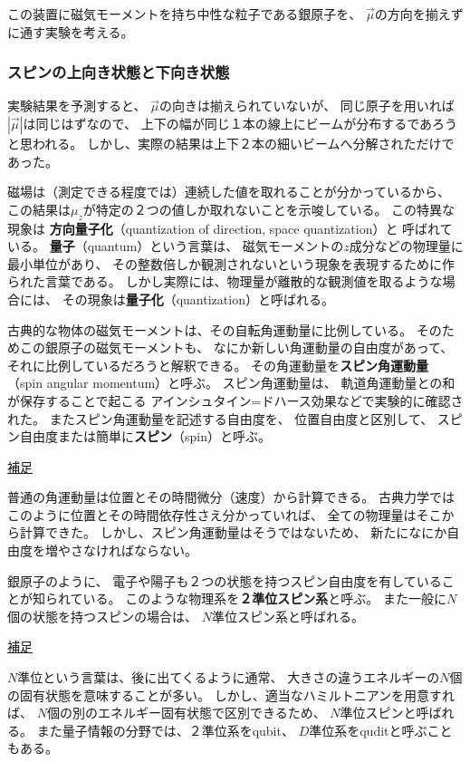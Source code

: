 \documentclass[a4paper, 10pt]{jsarticle}
\begin{document}
この装置に磁気モーメントを持ち中性な粒子である銀原子を、
$\vec{\mu}$の方向を揃えずに通す実験を考える。

\subsubsection{スピンの上向き状態と下向き状態}
実験結果を予測すると、
$\vec{\mu}$の向きは揃えられていないが、
同じ原子を用いれば$|\vec{\mu}|$は同じはずなので、
上下の幅が同じ１本の線上にビームが分布するであろうと思われる。
しかし、実際の結果は上下２本の細いビームへ分解されただけであった。

磁場は（測定できる程度では）連続した値を取れることが分かっているから、
この結果は$\mu_z$が特定の２つの値しか取れないことを示唆している。
この特異な現象は
\textbf{方向量子化}（quantization of direction, space quantization）と
呼ばれている。
\textbf{量子}（quantum）という言葉は、
磁気モーメントの$z$成分などの物理量に最小単位があり、
その整数倍しか観測されないという現象を表現するために作られた言葉である。
しかし実際には、物理量が離散的な観測値を取るような場合には、
その現象は\textbf{量子化}（quantization）と呼ばれる。

古典的な物体の磁気モーメントは、その自転角運動量に比例している。
そのためこの銀原子の磁気モーメントも、
なにか新しい角運動量の自由度があって、
それに比例しているだろうと解釈できる。
その角運動量を\textbf{スピン角運動量}（spin angular momentum）と呼ぶ。
スピン角運動量は、
軌道角運動量との和が保存することで起こる
アインシュタイン=ドハース効果などで実験的に確認された。
またスピン角運動量を記述する自由度を、
位置自由度と区別して、
スピン自由度または簡単に\textbf{スピン}（spin）と呼ぶ。

\begin{screen}
	\underline{補足}

	普通の角運動量は位置とその時間微分（速度）から計算できる。
	古典力学ではこのように位置とその時間依存性さえ分かっていれば、
	全ての物理量はそこから計算できた。
	しかし、スピン角運動量はそうではないため、
	新たになにか自由度を増やさなければならない。
\end{screen}
銀原子のように、
電子や陽子も２つの状態を持つスピン自由度を有していることが知られている。
このような物理系を\textbf{２準位スピン系}と呼ぶ。
また一般に$N$個の状態を持つスピンの場合は、
$N$準位スピン系と呼ばれる。

\begin{screen}
	\underline{補足}

	$N$準位という言葉は、後に出てくるように通常、
	大きさの違うエネルギーの$N$個の固有状態を意味することが多い。
	しかし、適当なハミルトニアンを用意すれば、
	$N$個の別のエネルギー固有状態で区別できるため、
	$N$準位スピンと呼ばれる。
	また量子情報の分野では、２準位系をqubit、
	$D$準位系をquditと呼ぶこともある。
\end{screen}
\end{document}
